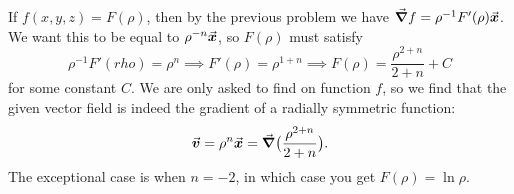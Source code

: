 \item[{\bf(10ii)}]

If $f(x, y, z)= F(\rho)$, then by the previous problem
we have ${\vec{\boldsymbol \nabla}} f = \rho^{-1}F'(\rho) {{\vec{\boldsymbol x}}}$.  We want this to be equal to
$\rho^{-n}{{\vec{\boldsymbol x}}}$, so $F(\rho)$ must satisfy
\[
\rho^{-1}F'(rho) = \rho^{n} \implies
F'(\rho) = \rho^{1+n} \implies
F(\rho) = \frac{\rho^{2+n}} {2+n} +C
\]
for some constant $C$.  We are only asked to find on function $f$,
so we find that the given vector field is indeed the gradient of a radially
symmetric function:
\[
{{\vec{\boldsymbol v}}} = \rho^{n}{{\vec{\boldsymbol x}}} = {\vec{\boldsymbol \nabla}} \bigl(\frac{\rho^{2+n}} {2+n}\bigr).
\]
The exceptional case is when $n=-2$, in which case you get
$F(\rho) = \ln \rho$.
\bigskip
